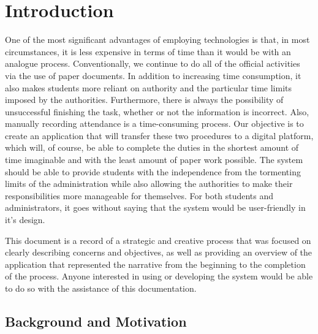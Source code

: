 
\section{Introduction}\label{sec:introduction}
One of the most significant advantages of employing technologies is that, in most circumstances, it is less expensive in terms of time than it would be with an analogue process. Conventionally, we continue to do all of the official activities via the use of paper documents. In addition to increasing time consumption, it also makes students more reliant on authority and the particular time limits imposed by the authorities. Furthermore, there is always the possibility of unsuccessful finishing the task, whether or not the information is incorrect. Also, manually recording attendance is a time-consuming process. Our objective is to create an application that will transfer these two procedures to a digital platform, which will, of course, be able to complete the duties in the shortest amount of time imaginable and with the least amount of paper work possible. The system should be able to provide students with the independence from the tormenting limits of the administration while also allowing the authorities to make their responsibilities more manageable for themselves. For both students and administrators, it goes without saying that the system would be user-friendly in it's design.

This document is a record of a strategic and creative process that was focused on clearly describing concerns and objectives, as well as providing an overview of the application that represented the narrative from the beginning to the completion of the process. Anyone interested in using or developing the system would be able to do so with the assistance of this documentation.


\clearpage


\subsection{Background and Motivation}\label{subsec:bm}

